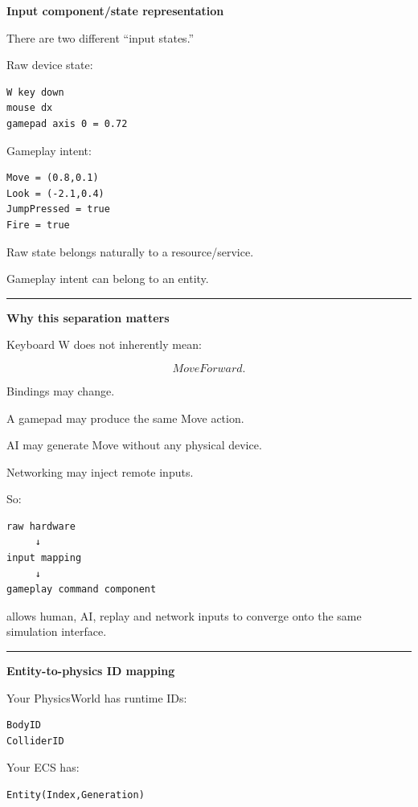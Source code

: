 \textbf{Input component/state representation}

There are two different ``input states.''

Raw device state:

\begin{verbatim}
W key down
mouse dx
gamepad axis 0 = 0.72
\end{verbatim}

Gameplay intent:

\begin{verbatim}
Move = (0.8,0.1)
Look = (-2.1,0.4)
JumpPressed = true
Fire = true
\end{verbatim}

Raw state belongs naturally to a resource/service.

Gameplay intent can belong to an entity.

\begin{center}\rule{0.5\linewidth}{0.5pt}\end{center}

\textbf{Why this separation matters}

Keyboard W does not inherently mean:

\[
MoveForward.
\]

Bindings may change.

A gamepad may produce the same Move action.

AI may generate Move without any physical device.

Networking may inject remote inputs.

So:

\begin{verbatim}
raw hardware
     ↓
input mapping
     ↓
gameplay command component
\end{verbatim}

allows human, AI, replay and network inputs to converge onto the same simulation interface.

\begin{center}\rule{0.5\linewidth}{0.5pt}\end{center}

\textbf{Entity-to-physics ID mapping}

Your PhysicsWorld has runtime IDs:

\begin{verbatim}
BodyID
ColliderID
\end{verbatim}

Your ECS has:

\begin{verbatim}
Entity(Index,Generation)
\end{verbatim}


